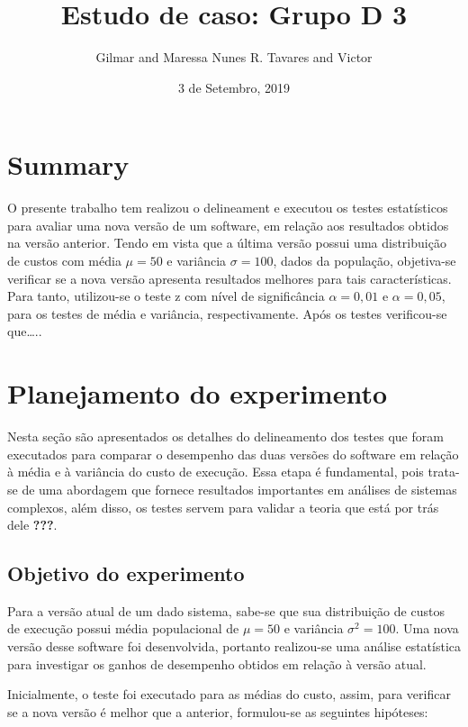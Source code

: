 \documentclass[]{article}
\title{Estudo de caso: Grupo D 3}
\author{Gilmar and Maressa Nunes R. Tavares and Victor}
\date{3 de Setembro, 2019}
\begin{document}
\maketitle

\hypertarget{summary}{%
\section{Summary}\label{summary}}

O presente trabalho tem realizou o delineament e executou os testes
estatísticos para avaliar uma nova versão de um software, em relação aos
resultados obtidos na versão anterior. Tendo em vista que a última
versão possui uma distribuição de custos com média \(\mu = 50\) e
variância \(\sigma = 100\), dados da população, objetiva-se verificar se
a nova versão apresenta resultados melhores para tais características.
Para tanto, utilizou-se o teste z com nível de significância
\(\alpha = 0,01\) e \(\alpha = 0,05\), para os testes de média e
variância, respectivamente. Após os testes verificou-se que\ldots{}..

\hypertarget{planejamento-do-experimento}{%
\section{Planejamento do
experimento}\label{planejamento-do-experimento}}

Nesta seção são apresentados os detalhes do delineamento dos testes que
foram executados para comparar o desempenho das duas versões do software
em relação à média e à variância do custo de execução. Essa etapa é
fundamental, pois trata-se de uma abordagem que fornece resultados
importantes em análises de sistemas complexos, além disso, os testes
servem para validar a teoria que está por trás dele {\textbf{???}}.

\hypertarget{objetivo-do-experimento}{%
\subsection{Objetivo do experimento}\label{objetivo-do-experimento}}

Para a versão atual de um dado sistema, sabe-se que sua distribuição de
custos de execução possui média populacional de \(\mu = 50\) e variância
\(\sigma^{2} = 100\). Uma nova versão desse software foi desenvolvida,
portanto realizou-se uma análise estatística para investigar os ganhos
de desempenho obtidos em relação à versão atual.

Inicialmente, o teste foi executado para as médias do custo, assim, para
verificar se a nova versão é melhor que a anterior, formulou-se as
seguintes hipóteses:
\end{document}
